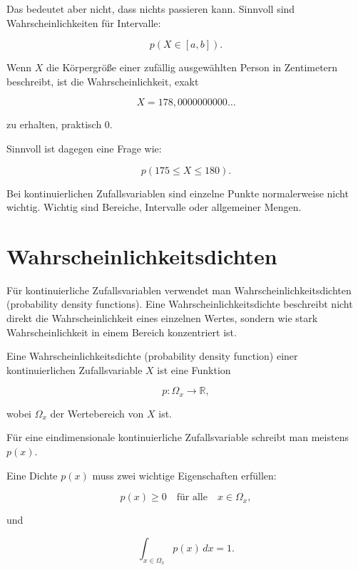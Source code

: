 Das bedeutet aber nicht, dass nichts passieren kann.
Sinnvoll sind Wahrscheinlichkeiten für Intervalle:

\[
    p(X \in [a,b]).
\]

\begin{examplebox}
Wenn \(X\) die Körpergröße einer zufällig ausgewählten Person in Zentimetern beschreibt, ist die Wahrscheinlichkeit, exakt

\[
    X = 178{,}0000000000\ldots
\]

zu erhalten, praktisch \(0\).

Sinnvoll ist dagegen eine Frage wie:

\[
    p(175 \leq X \leq 180).
\]
\end{examplebox}

\begin{notebox}
Bei kontinuierlichen Zufallsvariablen sind einzelne Punkte normalerweise nicht wichtig.
Wichtig sind Bereiche, Intervalle oder allgemeiner Mengen.
\end{notebox}

\section{Wahrscheinlichkeitsdichten}

Für kontinuierliche Zufallsvariablen verwendet man Wahrscheinlichkeitsdichten (probability density functions).
Eine Wahrscheinlichkeitsdichte beschreibt nicht direkt die Wahrscheinlichkeit eines einzelnen Wertes, sondern wie stark Wahrscheinlichkeit in einem Bereich konzentriert ist.

\begin{definitionbox}
Eine Wahrscheinlichkeitsdichte (probability density function) einer kontinuierlichen Zufallsvariable \(X\) ist eine Funktion

\[
    p : \Omega_x \to \mathbb{R},
\]

wobei \(\Omega_x\) der Wertebereich von \(X\) ist.

Für eine eindimensionale kontinuierliche Zufallsvariable schreibt man meistens \(p(x)\).
\end{definitionbox}

Eine Dichte \(p(x)\) muss zwei wichtige Eigenschaften erfüllen:

\[
    p(x) \geq 0
    \quad
    \text{für alle}
    \quad
    x \in \Omega_x,
\]

und

\[
    \int_{x \in \Omega_x} p(x)\,dx = 1.
\]

